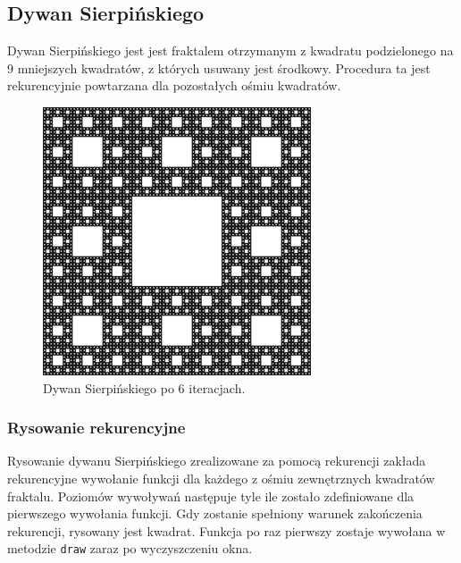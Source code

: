 \subsection{Dywan Sierpińskiego}
Dywan Sierpińskiego jest jest fraktalem otrzymanym z kwadratu podzielonego na 9 mniejszych kwadratów, z których usuwany jest środkowy. Procedura ta jest rekurencyjnie powtarzana dla pozostałych ośmiu kwadratów.
\begin{figure}[h]
  \centering
  \includegraphics[width=0.3\linewidth]{img/300px-Sierpinski6.png}
  \caption{Dywan Sierpińskiego po 6 iteracjach.}
\end{figure}

\subsubsection{Rysowanie rekurencyjne}
Rysowanie dywanu Sierpińskiego zrealizowane za pomocą rekurencji zakłada rekurencyjne wywołanie funkcji dla każdego z ośmiu zewnętrznych kwadratów fraktalu. Poziomów wywoływań następuje tyle ile zostało zdefiniowane dla pierwszego wywołania funkcji. Gdy zostanie spełniony warunek zakończenia rekurencji, rysowany jest kwadrat. Funkcja po raz pierwszy zostaje wywołana w metodzie \lstinline{draw} zaraz po wyczyszczeniu okna.

